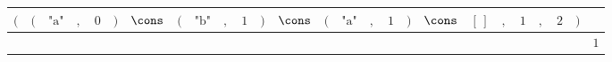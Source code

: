 {\scriptsize\setlength{\tabcolsep}{1.5pt}%
\begin{tabular}{ccccccccccccccccccccccccc|l}
$($ & $($ & $\text{"a"}$ & $,$ & $\text{0}$ & $)$ & $\cons$ & $($ & $\text{"b"}$ & $,$ & $\text{1}$ & $)$ & $\cons$ & $($ & $\text{"a"}$ & $,$ & $\text{1}$ & $)$ & $\cons$ & $[\,]$ & $,$ & $\text{1}$ & $,$ & $\text{2}$ & $)$ & \\ \hline
\gcell{$$} & \gcell{$$} & \gcell{$\posC{\circ}$} & \gcell{$\posC{\circ}$} & \gcell{$\posD{\bullet}$} & \gcell{$$} & \gcell{$\posC{\circ}$} & \gcell{$$} & \gcell{$\posC{\circ}$} & \gcell{$\posC{\circ}$} & \gcell{$$} & \gcell{$$} & \gcell{$\posC{\circ}$} & \gcell{$$} & \gcell{$\posC{\circ}$} & \gcell{$\posC{\circ}$} & \gcell{$\posD{\bullet}$} & \gcell{$$} & \gcell{$\posC{\circ}$} & \gcell{$\posC{\circ}$} & \gcell{$\posC{\circ}$} & \gcell{$\posD{\bullet}$} & \gcell{$\posC{\circ}$} & \gcell{$$} & \gcell{$$} & $\text{1}$ \\
\end{tabular}}
